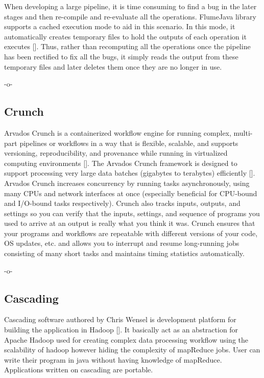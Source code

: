 When developing a large pipeline, it is time consuming to find a bug
in the later stages and then re-compile and re-evaluate all the
operations. FlumeJava library supports a cached execution mode to aid
in this scenario. In this mode, it automatically creates temporary
files to hold the outputs of each operation it
executes [\cite{flumejava-paper}]. Thus, rather than recomputing all the
operations once the pipeline has been rectified to fix all the bugs,
it simply reads the output from these temporary files and later
deletes them once they are no longer in use.

-o-

\subsection{Crunch}

Arvados Crunch is a containerized workflow engine for running complex,
multi-part pipelines or workflows in a way that is flexible, scalable,
and supports versioning, reproducibility, and provenance while running
in virtualized computing environments [\cite{www-arvados}]. The Arvados
Crunch framework is designed to support processing very large data
batches (gigabytes to terabytes)
efficiently [\cite{www-crunch}]. Arvados Crunch increases concurrency by
running tasks asynchronously, using many CPUs and network interfaces
at once (especially beneficial for CPU-bound and I/O-bound tasks
respectively). Crunch also tracks inputs, outputs, and settings so you
can verify that the inputs, settings, and sequence of programs you
used to arrive at an output is really what you think it was. Crunch
ensures that your programs and workflows are repeatable with different
versions of your code, OS updates, etc. and allows you to interrupt
and resume long-running jobs consisting of many short tasks and
maintains timing statistics automatically.

    -o-

\subsection{Cascading}

Cascading software authored by Chris Wensel is development platform
for building the application in Hadoop [\cite{www-cascading}].  It
basically act as an abstraction for Apache Hadoop used for creating
complex data processing workflow using the scalability of hadoop
however hiding the complexity of mapReduce jobs.  User can write their
program in java without having knowledge of mapReduce. Applications
written on cascading are portable.
 
